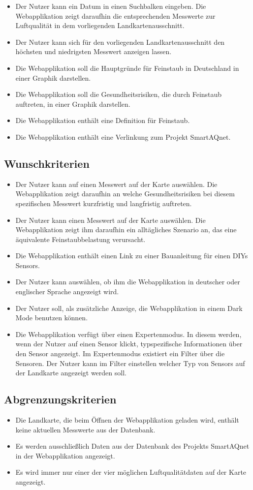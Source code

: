 \begin{itemize}
	\item Der Nutzer kann ein Datum in einen Suchbalken eingeben. 
	Die Webapplikation zeigt daraufhin die entsprechenden Messwerte zur Luftqualität in dem vorliegenden Landkartenausschnitt.
	\item Der Nutzer kann sich für den vorliegenden Landkartenausschnitt den höchsten und niedrigsten Messwert anzeigen lassen.
	\item Die Webapplikation soll die Hauptgründe für Feinstaub in Deutschland in einer Graphik darstellen.
	\item Die Webapplikation soll die Gesundheitsrisiken, die durch Feinstaub auftreten, in einer Graphik darstellen. 
	\item Die Webapplikation enthält eine Definition für Feinstaub.
	\item Die Webapplikation enthält eine Verlinkung zum Projekt SmartAQnet. 
\end{itemize}
\subsection{Wunschkriterien}
   \begin{itemize}
	\item Der Nutzer kann auf einen Messwert auf der Karte auswählen. 
	Die Webapplikation zeigt daraufhin an welche Gesundheitsrisiken bei diesem spezifischen Messwert kurzfristig und langfristig auftreten.
	\item Der Nutzer kann einen Messwert auf der Karte auswählen. 
	Die Webapplikation zeigt ihm daraufhin ein alltägliches Szenario an, das eine äquivalente Feinstaubbelastung verursacht.
	\item Die Webapplikation enthält einen Link zu einer Bauanleitung für einen \glspl{DIY} \glspl{Sensor}.
	\item Der Nutzer kann auswählen, ob ihm die Webapplikation in deutscher oder englischer Sprache angezeigt wird.
	\item Der Nutzer soll, als zusätzliche Anzeige, die Webapplikation in einem Dark Mode benutzen können.
	\item Die Webapplikation verfügt über einen Expertenmodus. In diesem werden, wenn der Nutzer auf einen Sensor klickt, typspezifische Informationen über den Sensor angezeigt.
	Im Expertenmodus existiert ein Filter über die Sensoren. Der Nutzer kann im Filter einstellen welcher Typ von \glspl{Sensor} auf der Landkarte angezeigt werden soll.        
\end{itemize}
\subsection{Abgrenzungskriterien}
    \begin{itemize}
	\item Die Landkarte, die beim Öffnen der Webapplikation geladen wird, enthält keine aktuellen Messwerte aus der Datenbank.
	\item Es werden ausschließlich Daten aus der Datenbank des Projekts SmartAQnet in der Webapplikation angezeigt.
	\item Es wird immer nur einer der vier möglichen Luftqualitätdaten auf der Karte angezeigt.
\end{itemize}